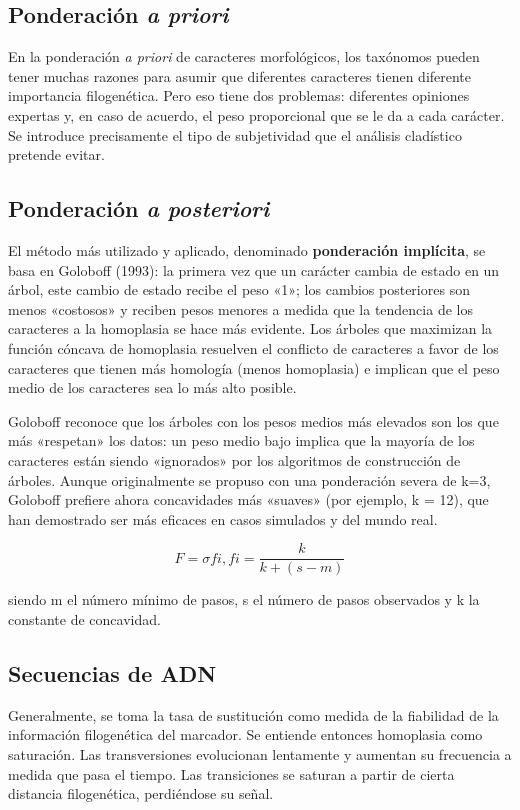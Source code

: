 \subsection{Ponderación \textit{a priori}}
En la ponderación \textit{a priori} de caracteres morfológicos, los taxónomos pueden tener muchas razones para asumir que diferentes caracteres tienen diferente importancia filogenética. Pero eso tiene dos problemas: diferentes opiniones expertas y, en caso de acuerdo, el peso proporcional que se le da a cada carácter. Se introduce precisamente el tipo de subjetividad que el análisis cladístico pretende evitar.

\subsection{Ponderación \textit{a posteriori}}
El método más utilizado y aplicado, denominado \textbf{ponderación implícita}, se basa en Goloboff (1993): la primera vez que un carácter cambia de estado en un árbol, este cambio de estado recibe el peso «1»; los cambios posteriores son menos «costosos» y reciben pesos menores a medida que la tendencia de los caracteres a la homoplasia se hace más evidente. Los árboles que maximizan la función cóncava de homoplasia resuelven el conflicto de caracteres a favor de los caracteres que tienen más homología (menos homoplasia) e implican que el peso medio de los caracteres sea lo más alto posible.

Goloboff reconoce que los árboles con los pesos medios más elevados son los que más «respetan» los datos: un peso medio bajo implica que la mayoría de los caracteres están siendo «ignorados» por los algoritmos de construcción de árboles. Aunque originalmente se propuso con una ponderación severa de k=3, Goloboff prefiere ahora concavidades más «suaves» (por ejemplo, k = 12), que han demostrado ser más eficaces en casos simulados y del mundo real.

$$F = \sigma fi, fi = \frac{k}{k+(s-m)} $$

siendo m el número mínimo de pasos, s el número de pasos observados y k la constante de concavidad.

\subsection{Secuencias de ADN}
 Generalmente, se toma la tasa de sustitución como medida de la fiabilidad de la información filogenética del marcador. Se entiende entonces homoplasia como saturación. Las transversiones evolucionan lentamente y aumentan su frecuencia a medida que pasa el tiempo. Las transiciones se saturan a partir de cierta distancia filogenética, perdiéndose su señal. 
 
